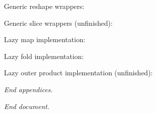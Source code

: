 \documentclass{DIKU-report-variant}
\begin{document}
Generic reshape wrappers:


Generic slice wrappers (unfinished):


Lazy map implementation:


Lazy fold implementation:


Lazy outer product implementation (unfinished):


\vfill
\begin{center}\itshape End appendices.\end{center}
\clearpage


\vfill
\begin{center}\itshape End document.\end{center}
\end{document}
